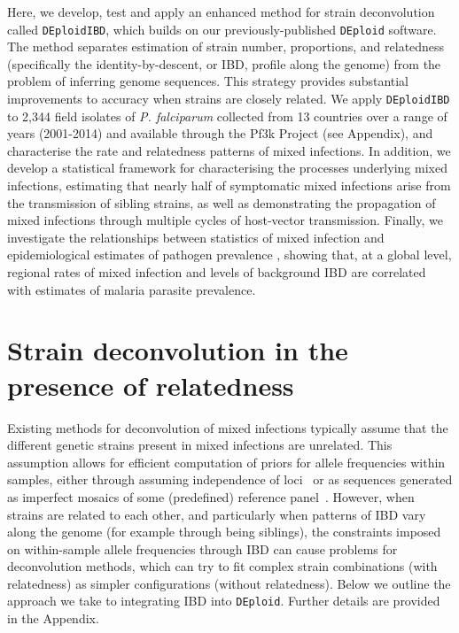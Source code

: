 \documentclass[9pt,lineno]{elife}
\begin{document}
Here, we develop, test and apply an enhanced method for strain deconvolution called \texttt{DEploidIBD}, which builds on our previously-published \texttt{DEploid} software.  The method separates estimation of strain number, proportions, and relatedness (specifically the identity-by-descent, or IBD, profile along the genome) from the problem of inferring genome sequences. This strategy provides substantial improvements to accuracy when strains are closely related.  We apply \texttt{DEploidIBD} to 2,344 field isolates of {\it P. falciparum} collected from 13 countries over a range of years (2001-2014) and available through the Pf3k Project (see Appendix), and characterise the rate and relatedness patterns of mixed infections.  In addition, we develop a statistical framework for characterising the processes underlying mixed infections, estimating that nearly half of symptomatic mixed infections arise from the transmission of sibling strains, as well as demonstrating the propagation of mixed infections through multiple cycles of host-vector transmission.  Finally, we investigate the relationships between statistics of mixed infection and epidemiological estimates of pathogen prevalence \citep{MAP2017}, showing that, at a global level, regional rates of mixed infection and levels of background IBD are correlated with estimates of malaria parasite prevalence.

\section{Strain deconvolution in the presence of relatedness}

Existing methods for deconvolution of mixed infections typically assume that the different genetic strains present in mixed infections are unrelated.  This assumption allows for efficient computation of priors for allele frequencies within samples, either through assuming independence of loci~\citep{Jack2016} or as sequences generated as imperfect mosaics of some (predefined) reference panel~\citep{Zhu2017}.  However, when strains are related to each other, and particularly when patterns of IBD vary along the genome (for example through being siblings), the constraints imposed on within-sample allele frequencies through IBD can cause problems for deconvolution methods, which can try to fit complex strain combinations (with relatedness) as simpler configurations (without relatedness).  Below we outline the approach we take to integrating IBD into \texttt{DEploid}.  Further details are provided in the Appendix.
\end{document}
